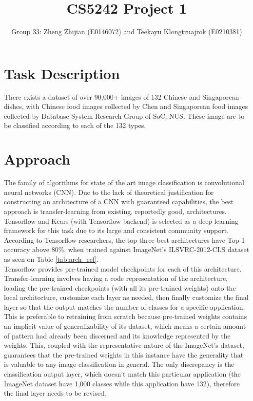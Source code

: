 \documentclass[a4paper]{article}
\title{CS5242 Project 1}
\author{Group 33: Zheng Zhijian (E0146072) and Teekayu Klongtruajrok (E0210381)}
\begin{document}
\maketitle

\section{Task Description}

There exists a dataset of over 90,000+ images of 132 Chinese and Singaporean dishes, with Chinese food images collected by Chen \cite{Chen2016} and Singaporean food images collected by Database System Research Group of SoC, NUS. These image are to be classified according to each of the 132 types. 

\section{Approach}

The family of algorithms for state of the art image classification is convolutional neural networks (CNN). Due to the lack of theoretical justification for constructing an architecture of a CNN with guaranteed capabilities, the best approach is transfer-learning from existing, reportedly good, architectures. Tensorflow and Kears (with Tensorflow backend) is selected as a deep learning framework for this task due to its large and consistent community support. According to Tensorflow researchers, the top three best architectures have Top-1 accuracy above 80\%, when trained against ImageNet's ILSVRC-2012-CLS dataset \cite{Silberman2017} as seen on Table \ref{tab:arch_ref}. \\

Tensorflow provides pre-trained model checkpoints for each of this architecture. Transfer-learning involves having a code representation of the architecture, loading the pre-trained checkpoints (with all its pre-trained weights) onto the local architecture, customize each layer as needed, then finally customize the final layer so that the output matches the number of classes for a specific application. \\

This is preferable to retraining from scratch because pre-trained weights contains an implicit value of generalizability of its dataset, which means a certain amount of pattern had already been discerned and its knowledge represented by the weights. This, coupled with the representative nature of the ImageNet's dataset, guarantees that the pre-trained weights in this instance have the generality that is valuable to any image classification in general. The only discrepancy is the classification output layer, which doesn't match this particular application (the ImageNet dataset have 1,000 classes while this application have 132), therefore the final layer needs to be revised. \\
\end{document}
